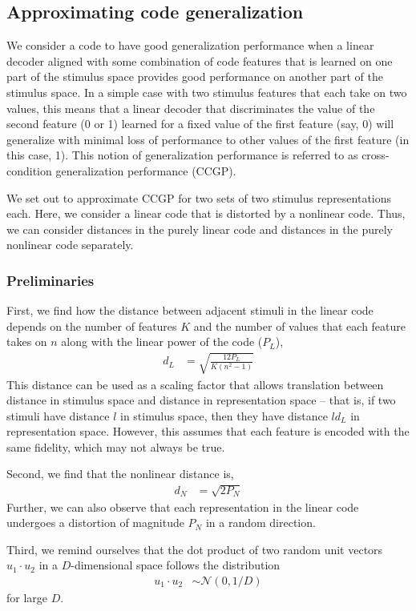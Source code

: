 \documentclass[letter,12pt]{article}
\newcommand{\dis}{\mathcal{N}(0, 1/D)}
\begin{document}
\subsection{Approximating code generalization}
We consider a code to have good generalization performance when a linear decoder
aligned with some combination of code features that is learned on one part of the
stimulus space provides good performance on another part of the stimulus space.
In a simple case with two stimulus features that each take on two values, this
means that a linear decoder that discriminates the value of the second feature
(0 or 1) learned for a fixed value of the first feature (say, 0) will generalize
with minimal loss of performance to other values of the first feature (in this
case, 1). This notion of generalization performance is referred to as
cross-condition generalization performance (CCGP).

We set out to approximate CCGP for two sets of two stimulus representations
each. Here, we consider a linear code that is distorted by a nonlinear code.
Thus, we can consider distances in the purely linear code and distances in the
purely nonlinear code separately.

\subsubsection{Preliminaries}
First, we find how the distance between
adjacent stimuli in the linear code depends on the number of features $K$ and
the number of values that each feature takes on $n$ along with the linear power
of the code ($P_{L}$),
\begin{align}
d_{L} &= \sqrt{\frac{12 P_{L}}{K (n^2 - 1)}}
\end{align}
This distance can be used as a scaling factor that allows translation between
distance in stimulus space and distance in representation space -- that is,
if two stimuli have distance $l$ in stimulus space, then they have distance
$l d_{L}$ in representation space. However, this assumes that each feature is
encoded with the same fidelity, which may not always be true.

Second, we find that the nonlinear distance is,
\begin{align}
  d_{N} &= \sqrt{2 P_{N}}
\end{align}
Further, we can also observe that each representation in the linear code
undergoes a distortion of magnitude $P_{N}$ in a random direction.

Third, we remind ourselves that the dot product of two random unit vectors
$u_{1} \cdot u_{2}$ in a $D$-dimensional space follows the distribution
\begin{align}
  u_{1} \cdot u_{2} &\sim \dis
\end{align}
for large $D$.
\end{document}
